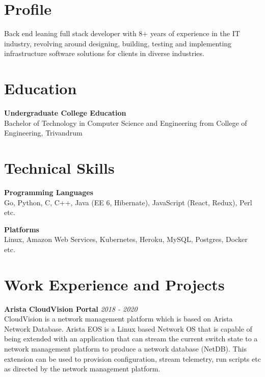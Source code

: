 \documentclass[line,margin]{res}
\begin{document}

\address{jojiantony@yandex.com}
\address{+91 96323 41954}

\begin{resume}

\section{Profile}
Back end leaning full stack developer with 8+ years of experience in the IT industry, revolving around designing, building, testing and implementing infrastructure software solutions for clients in diverse industries.

\section{Education}
{\bf Undergraduate College Education}\\
Bachelor of Technology in Computer Science and Engineering from College of Engineering, Trivandrum\\

\section{Technical Skills}

{\bf Programming Languages}\\
Go, Python, C, C++, Java (EE 6, Hibernate), JavaScript (React, Redux), Perl etc.

{\bf Platforms}\\
Linux, Amazon Web Services, Kubernetes, Heroku, MySQL, Postgres, Docker etc.

\section{Work Experience and Projects}

{\bf Arista CloudVision Portal} \hfill {\it{2018 - 2020}}\\

CloudVision is a network management platform which is based on Arista Network Database. Arista EOS is a Linux based Network OS that is capable of being extended with an application that can stream the current switch state to a network management platform to produce a network database (NetDB). This extension can be used to provision configuration, stream telemetry, run scripts etc as directed by the network management platform. 


\end{resume}
\end{document}
